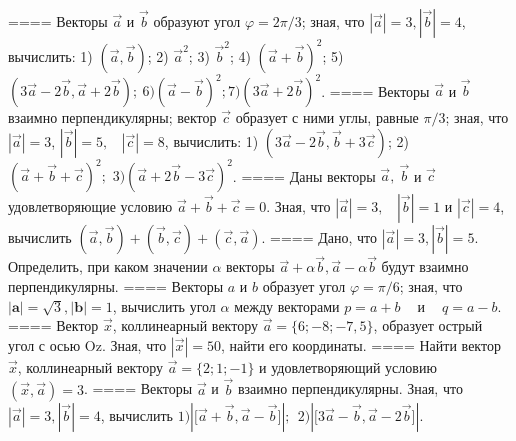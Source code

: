 ====
Векторы \(\overrightarrow{a}\) и \(\overrightarrow{b}\) образуют угол \(\varphi = 2\pi/3\); зная, что \(|\overrightarrow{a}| = 3,|\overrightarrow{b}| = 4\), вычислить: 1) \(\left( \overrightarrow{a},\overrightarrow{b} \right)\); 2) \({\overrightarrow{a}}^{2}\); 3) \({\overrightarrow{b}}^{2}\); 4) \((\overrightarrow{a} + \overrightarrow{b})^{2}\); 5) \(\left( 3\overrightarrow{a} - 2\overrightarrow{b},\overrightarrow{a} + 2\overrightarrow{b} \right);\ 6)(\overrightarrow{a} - \overrightarrow{b})^{2};7)(3\overrightarrow{a} + 2\overrightarrow{b})^{2}\).
====
Векторы \(\overrightarrow{a}\) и \(\overrightarrow{b}\) взаимно перпендикулярны; вектор \(\overrightarrow{c}\) образует с ними углы, равные \(\pi/3\); зная, что \(|\overrightarrow{a}| = 3\), \(|\overrightarrow{b}| = 5,\ \ \ \ |\overrightarrow{c}| = 8\), вычислить: 1) \(\left( 3\overrightarrow{a} - 2\overrightarrow{b},\overrightarrow{b} + 3\overrightarrow{c} \right)\); 2) \((\overrightarrow{a} + \overrightarrow{b} + \overrightarrow{c})^{2};\) \(3)(\overrightarrow{a} + 2\overrightarrow{b} - 3\overrightarrow{c})^{2}\).
====
Даны векторы \(\overrightarrow{a},\ \overrightarrow{b}\) и \(\overrightarrow{c}\) удовлетворяющие условию \(\overrightarrow{a} + \overrightarrow{b} + \overrightarrow{c} = 0\). Зная, что \(|\overrightarrow{a}| = 3,\ \ \ \ |\overrightarrow{b}| = 1\) и \(|\overrightarrow{c}| = 4\), вычислить \(\left( \overrightarrow{a},\overrightarrow{b} \right) + \left( \overrightarrow{b},\overrightarrow{c} \right) + \left( \overrightarrow{c},\overrightarrow{a} \right)\).
====
Дано, что \(|\overrightarrow{a}| = 3,|\overrightarrow{b}| = 5\). Определить, при каком значении \(\alpha\) векторы \(\overrightarrow{a} + \alpha\overrightarrow{b},\overrightarrow{a} - \alpha\overrightarrow{b}\) будут взаимно перпендикулярны.
====
Векторы \(a\) и \(b\) образует угол \(\varphi = \pi/6\); зная, что \(|\mathbf{a}| = \sqrt{3},|\mathbf{b}| = 1\), вычислить угол \(\alpha\) между векторами \(p = a + b\ \ \ \ \) и \(\ \ \ \ q = a - b\).
====
Вектор \(\overrightarrow{x}\), коллинеарный вектору \(\overrightarrow{a} = \{ 6; - 8; - 7,5\}\), образует острый угол с осью Oz. Зная, что \(|\overrightarrow{x}| = 50\), найти его координаты.
====
Найти вектор \(\overrightarrow{x}\), коллинеарный вектору \(\overrightarrow{a} = \{ 2;1; - 1\}\) и удовлетворяющий условию \(\left( \overrightarrow{x},\overrightarrow{a} \right) = 3\).
====
Векторы \(\overrightarrow{a}\) и \(\overrightarrow{b}\) взаимно перпендикулярны. Зная, что \(|\overrightarrow{a}| = 3,|\overrightarrow{b}| = 4\), вычислить \(1)|\lbrack\overrightarrow{a} + \overrightarrow{b},\overrightarrow{a} - \overrightarrow{b}\rbrack|;\ \ 2)|\lbrack 3\overrightarrow{a} - \overrightarrow{b},\overrightarrow{a} - 2\overrightarrow{b}\rbrack|\).
